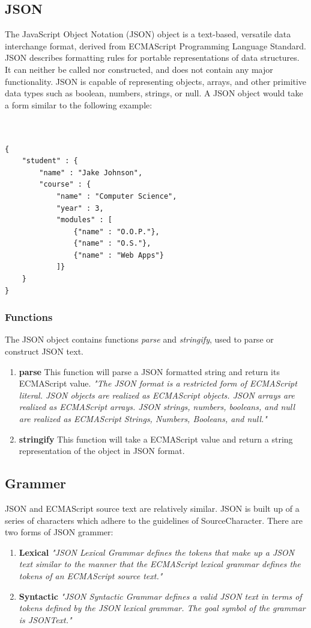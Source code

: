 \subsection{JSON}
	The JavaScript Object Notation (JSON) object is a text-based, versatile data interchange format, derived from ECMAScript Programming Language Standard. JSON describes formatting rules for portable representations of data structures\cite{crockford}. It can neither be called nor constructed, and does not contain any major functionality\cite{ecma}. JSON is capable of representing objects, arrays, and other primitive data types such as boolean, numbers, strings, or null\cite{crockford}.  A JSON object would take a form similar to the following example:
\\
\\
\\
\begin{verbatim}
{
	"student" : {
		"name" : "Jake Johnson",
		"course" : {
			"name" : "Computer Science",
			"year" : 3,
			"modules" : [ 
				{"name" : "O.O.P."},
				{"name" : "O.S."},
				{"name" : "Web Apps"} 
			]}
	}
}
\end{verbatim}
\subsubsection{Functions}
The JSON object contains functions \emph{parse} and \emph{stringify}, used to parse or construct JSON text. 
\begin{enumerate}
\item \textbf{parse} This function will parse a JSON formatted string and return its ECMAScript value. \emph{"The JSON format is a restricted form of ECMAScript literal. JSON objects are realized as ECMAScript objects. JSON arrays are realized as ECMAScript arrays. JSON strings, numbers, booleans, and null are realized as ECMAScript Strings, Numbers, Booleans, and null."\cite{crockford}}
\item \textbf{stringify} This function will take a ECMAScript value and return a string representation of the object in JSON format. \cite{crockford}
\end{enumerate}
\subsection{Grammer}
JSON and ECMAScript source text are relatively similar. JSON is built up of a series of characters which adhere to the guidelines of SourceCharacter. There are two forms of JSON grammer:
\begin{enumerate}
\item \textbf{Lexical} \emph{"JSON Lexical Grammar defines the tokens that make up a JSON text similar to the manner that the ECMAScript lexical grammar defines the tokens of an ECMAScript source text."\cite{ecma}} 
\item \textbf{Syntactic} \emph{"JSON Syntactic Grammar defines a valid JSON text in terms of tokens defined by the JSON lexical grammar. The goal symbol of the grammar is JSONText."\cite{ecma}}
\end{enumerate}

